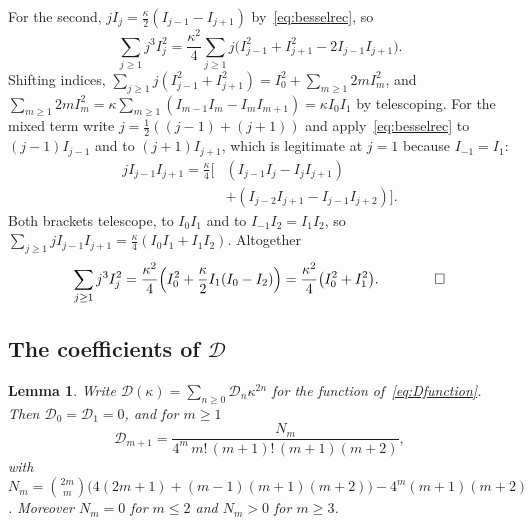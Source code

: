 \documentclass[aps,prd,twocolumn,superscriptaddress,nofootinbib,longbibliography,floatfix,amsmath,amssymb,10pt]{revtex4-2}
\newtheorem{lemma}[theorem]{Lemma}
\theoremstyle{definition}
\theoremstyle{remark}
\begin{document}
For the second, $jI_j=\frac\kappa2(I_{j-1}-I_{j+1})$ by~\eqref{eq:besselrec}, so
\[
\sum_{j\ge1}j^3I_j^2=\frac{\kappa^2}4\sum_{j\ge1}j\bigl(I_{j-1}^2+I_{j+1}^2-
2I_{j-1}I_{j+1}\bigr).
\]
Shifting indices, $\sum_{j\ge1}j(I_{j-1}^2+I_{j+1}^2)=I_0^2+\sum_{m\ge1}2m
I_m^2$, and $\sum_{m\ge1}2mI_m^2=\kappa\sum_{m\ge1}(I_{m-1}I_m-I_mI_{m+1})=
\kappa I_0I_1$ by telescoping. For the mixed term write $j=\frac12((j-1)+(j+1))$
and apply~\eqref{eq:besselrec} to $(j-1)I_{j-1}$ and to $(j+1)I_{j+1}$, which is
legitimate at $j=1$ because $I_{-1}=I_1$:
\[
\begin{aligned}
jI_{j-1}I_{j+1}=\frac\kappa4\bigl[&(I_{j-1}I_j-I_jI_{j+1})\\
&+(I_{j-2}I_{j+1}-I_{j-1}I_{j+2})\bigr].
\end{aligned}
\]
Both brackets telescope, to $I_0I_1$ and to $I_{-1}I_2=I_1I_2$, so
$\sum_{j\ge1}jI_{j-1}I_{j+1}=\frac\kappa4(I_0I_1+I_1I_2)$. Altogether
\[
\sum_{j\ge1}j^3I_j^2=\frac{\kappa^2}4\Bigl(I_0^2+\frac\kappa2I_1(I_0-I_2)
\Bigr)=\frac{\kappa^2}4\bigl(I_0^2+I_1^2\bigr). \qquad\qed
\]

\subsection{\texorpdfstring{The coefficients of $\mathcal D$}{The coefficients of D}}

\begin{lemma}\label{lem:Dcoef}
Write $\mathcal D(\kappa)=\sum_{n\ge0}\mathcal D_n\kappa^{2n}$ for the function
of~\eqref{eq:Dfunction}. Then $\mathcal D_0=\mathcal D_1=0$, and for $m\ge1$
\[
\mathcal D_{m+1}=\frac{N_m}{4^m\,m!\,(m+1)!\,(m+1)(m+2)},
\]
with $N_m=\binom{2m}m\bigl(4(2m+1)+(m-1)(m+1)(m+2)\bigr)-4^m(m+1)(m+2)$.
Moreover $N_m=0$ for $m\le2$ and $N_m>0$ for $m\ge3$.
\end{lemma}
\end{document}
